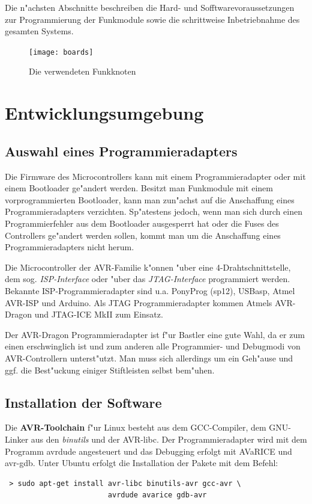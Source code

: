 \documentclass{clt2011}
\begin{document}
Die n"achsten Abschnitte beschreiben die Hard- und Sofftwarevoraussetzungen
zur Programmierung der Funkmodule sowie die schrittweise Inbetriebnahme des gesamten
Systems.

\begin{figure}
\centering
\texttt{[image: boards]}
\caption{Die verwendeten Funkknoten}
\label{fig:boards}
\end{figure}

\section{Entwicklungsumgebung}
\subsection*{Auswahl eines Programmieradapters}

Die Firmware des Microcontrollers kann mit einem Programmieradapter oder mit einem Bootloader
ge"andert werden.
Besitzt man Funkmodule mit einem vorprogrammierten Bootloader, kann man zun"achst auf die
Anschaffung eines Programmieradapters verzichten. Sp"atestens jedoch, wenn man sich durch
einen Programmierfehler aus dem Bootloader ausgesperrt hat oder die Fuses des Controllers
ge"andert werden sollen, kommt man um die Anschaffung eines Programmieradapters nicht herum.

Die Microcontroller der AVR-Familie k"onnen "uber eine 4-Drahtschnittstelle, dem sog. {\em ISP-Interface} oder
"uber das {\em JTAG-Interface} programmiert werden. Bekannte ISP-Programmier\-adapter sind u.a.
PonyProg (sp12), USBasp, \textsf{Atmel} AVR-ISP und Arduino.
Als JTAG Programmieradapter kommen \textsf{Atmel}s AVR-Dragon und JTAG-ICE MkII zum Einsatz.

Der AVR-Dragon Programmieradapter ist f"ur Bastler eine gute Wahl, da er zum einen erschwinglich
ist und zum anderen alle Programmier- und Debugmodi von AVR-Controllern unterst"utzt. Man
muss sich allerdings um ein Geh"ause und ggf. die Best"uckung einiger Stiftleisten selbst bem"uhen.

\subsection*{Installation der Software}
Die {\bf AVR-Toolchain} f"ur Linux besteht aus dem GCC-Compiler, dem GNU-Linker aus den
{\em binutils} und der AVR-libc. Der Programmieradapter wird mit dem Programm avrdude angesteuert
und das Debugging erfolgt mit AVaRICE und avr-gdb.
Unter Ubuntu erfolgt die Installation der Pakete mit dem Befehl:
\begin{lstlisting}
 > sudo apt-get install avr-libc binutils-avr gcc-avr \
                        avrdude avarice gdb-avr
\end{lstlisting}
\end{document}
